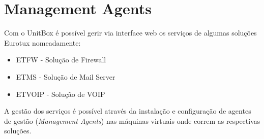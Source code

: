 
\chapter{\textsf{Management Agents}}

Com o UnitBox é possível gerir via interface web os serviços de algumas soluções Eurotux nomeadamente:
\begin{itemize}
	\item ETFW - Solução de Firewall
	\item ETMS - Solução de Mail Server
	\item ETVOIP - Solução de VOIP
\end{itemize}
    
    
A gestão dos serviços é possível através da instalação e configuração de agentes de gestão (\emph{Management Agents}) nas máquinas virtuais onde correm as respectivas soluções.



\pagebreak

\pagebreak


